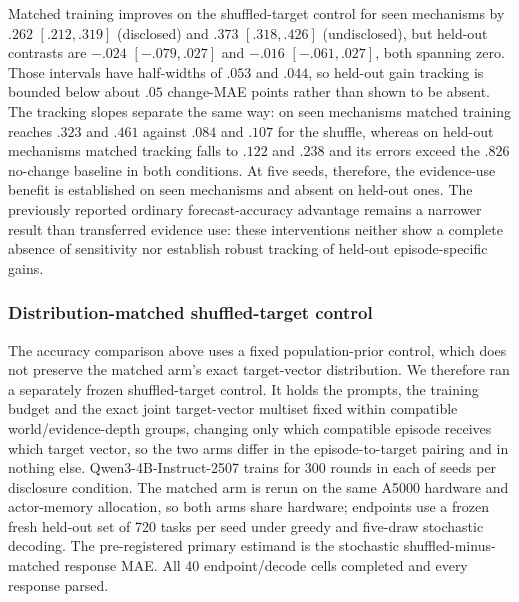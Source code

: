 Matched training improves on the shuffled-target control for seen mechanisms
by $.262$ $[.212,.319]$ (disclosed) and $.373$ $[.318,.426]$ (undisclosed),
but held-out contrasts are $-.024$ $[-.079,.027]$ and $-.016$
$[-.061,.027]$, both spanning zero. Those intervals have half-widths of $.053$
and $.044$, so held-out gain tracking is bounded below about $.05$ change-MAE
points rather than shown to be absent. The tracking slopes separate the same way:
on seen mechanisms matched training reaches $.323$ and $.461$ against $.084$
and $.107$ for the shuffle, whereas on held-out mechanisms matched tracking
falls to $.122$ and $.238$ and its errors exceed the $.826$ no-change baseline
in both conditions. At five seeds, therefore, the evidence-use benefit is
established on seen mechanisms and absent on held-out ones. The previously
reported ordinary forecast-accuracy advantage remains a narrower result than
transferred evidence use: these interventions neither show a complete absence
of sensitivity nor establish robust tracking of held-out episode-specific
gains.

\subsubsection{Distribution-matched shuffled-target control}
\label{app:exp3-shuffled-control}

The accuracy comparison above uses a fixed population-prior control, which does
not preserve the matched arm's exact target-vector distribution. We therefore
ran a separately frozen shuffled-target control. It holds the prompts, the
training budget and the exact joint target-vector multiset fixed within
compatible world/evidence-depth groups, changing only which compatible episode
receives which target vector, so the two arms differ in the episode-to-target
pairing and in nothing else. Qwen3-4B-Instruct-2507 trains for 300 rounds in
each of \eShufG{} seeds per disclosure condition. The matched arm is rerun on
the same A5000 hardware and actor-memory allocation, so both arms share
hardware; endpoints use a frozen fresh held-out set of 720 tasks per seed under
greedy and five-draw stochastic decoding. The pre-registered primary estimand
is the stochastic shuffled-minus-matched response MAE. All 40 endpoint/decode
cells completed and every response parsed.

\begin{table}[htbp]
\centering\footnotesize
\setlength{\tabcolsep}{3pt}

\caption{\textbf{Matched training retains a smaller advantage over a
distribution-matched shuffled-target control.} Entries are shuffled-minus-matched
response MAE at \eShufG{} training seeds; positive favors matched training.
The hierarchical interval resamples seeds and trajectories; Webb $p$ is a
two-sided wild cluster bootstrap. The stochastic inferred-mechanism cell is the
pre-registered primary endpoint and the only cell clearing every estimator.}
\label{tab:exp3-shuffled-control}
\end{table}

